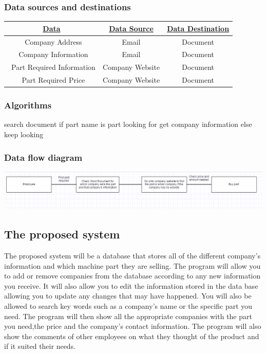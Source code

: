 \subsubsection{Data sources and destinations}

\begin{center}
\begin{tabular}{ |c|c|c| } 
\hline
\bf\underline{Data}                                                                                                      & \bf\underline{Data Source} & \bf\underline{Data Destination}

\\
\hline
\ Company Address & Email & Document\\ 
\hline
\ Company Information & Email & Document\\
\hline
\ Part Required Information & Company Website & Document\\
\hline
\ Part Required Price & Company Website & Document\\
\hline
\end{tabular}
\end{center}
\subsubsection{Algorithms}

search document
if part name is part looking for
get company information
else
keep looking

\subsubsection{Data flow diagram}
\includegraphics{Flowchart.png}


\subsection{The proposed system}
The proposed system will be a database that stores all of the different company's information and which machine part they are selling. The program will allow you to add or remove companies from the database according to any new information you receive. It will also allow you to edit the information stored in the data base allowing you to update any changes that may have happened. You will also be allowed to search key words such as a company's name or the specific part you need. The program will then show all the appropriate companies with the part you need,the price and the company's contact information. The program will also show the comments of other employees on what they thought of the product and if it suited their needs.

